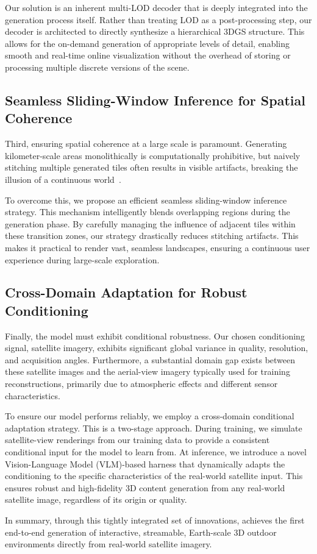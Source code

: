 Our solution is an inherent multi-LOD decoder that is deeply integrated into the generation process itself. Rather than treating LOD as a post-processing step, our decoder is architected to directly synthesize a hierarchical 3DGS structure. This allows for the on-demand generation of appropriate levels of detail, enabling smooth and real-time online visualization without the overhead of storing or processing multiple discrete versions of the scene.

\subsection{Seamless Sliding-Window Inference for Spatial Coherence}
\label{sec:sliding_window}

Third, ensuring {spatial coherence} at a large scale is paramount. Generating kilometer-scale areas monolithically is computationally prohibitive, but naively stitching multiple generated tiles often results in visible artifacts, breaking the illusion of a continuous world~\cite{blockfusion,ren2024xcube,earthcrafter,Qian_2023_Sat2Density,sat2densitypp,qian2026sat3dgen}.

To overcome this, we propose an efficient seamless sliding-window inference strategy. This mechanism intelligently blends overlapping regions during the generation phase. By carefully managing the influence of adjacent tiles within these transition zones, our strategy drastically reduces stitching artifacts. This makes it practical to render vast, seamless landscapes, ensuring a continuous user experience during large-scale exploration.

\subsection{Cross-Domain Adaptation for Robust Conditioning}
\label{sec:conditioning}

Finally, the model must exhibit {conditional robustness}. Our chosen conditioning signal, satellite imagery, exhibits significant global variance in quality, resolution, and acquisition angles. Furthermore, a substantial domain gap exists between these satellite images and the aerial-view imagery typically used for training reconstructions, primarily due to atmospheric effects and different sensor characteristics.

To ensure our model performs reliably, we employ a cross-domain conditional adaptation strategy. This is a two-stage approach. During training, we simulate satellite-view renderings from our training data to provide a consistent conditional input for the model to learn from. At inference, we introduce a novel Vision-Language Model (VLM)-based harness that dynamically adapts the conditioning to the specific characteristics of the real-world satellite input. This ensures robust and high-fidelity 3D content generation from any real-world satellite image, regardless of its origin or quality.

In summary, through this tightly integrated set of innovations, \method{} achieves the first end-to-end generation of interactive, streamable, Earth-scale 3D outdoor environments directly from real-world satellite imagery.